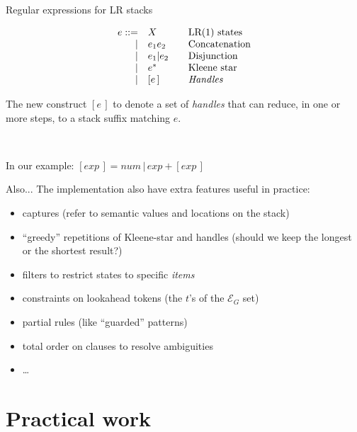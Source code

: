 \documentclass[aspectratio=169]{beamer}          %
\begin{document}
\begin{frame}[t]{Regular expressions for LR stacks}

  $$
  \begin{array}{rlll}
    e ::=& X      & & \text{LR(1) states}\\
    | & e_1 e_2   & & \text{Concatenation}\\
    | & e_1 | e_2 & & \text{Disjunction}\\
    | & e^*       & & \text{Kleene star}\\
    | & [e\,]     & & \text{{\em Handles}}
  \end{array}
  $$

  \pause
  \vspace{1cm}
  The new construct $[e\,]$ to denote a set of {\em handles}
  that can reduce, in one or more steps, to a stack suffix matching $e$.

    \

  \pause
  In our example:
  $[exp\,] = num\,\big|\,exp + [exp\,]$
\end{frame}

\begin{frame}{Also...}
  The implementation also have extra features useful in practice:
  \begin{itemize}
    \item captures (refer to semantic values and locations on the stack)
    \item ``greedy'' repetitions of Kleene-star and handles (should we keep the longest or the shortest result?)
    \item filters to restrict states to specific {\em items}
    \item constraints on lookahead tokens (the $t$'s of the $\mathcal E_G$ set)
    \item partial rules (like ``guarded'' patterns)
    \item total order on clauses to resolve ambiguities
    \item \ldots
  \end{itemize}

\end{frame}

\section{Practical work}
\end{document}
